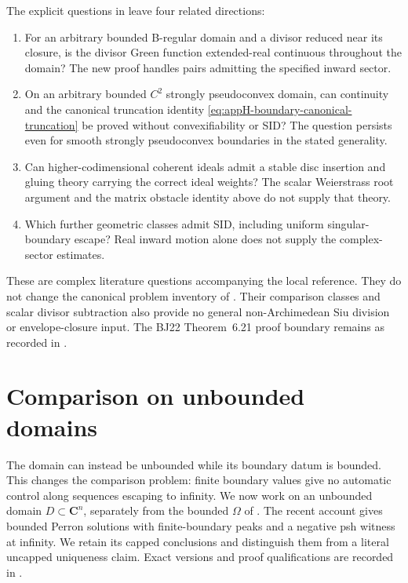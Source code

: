 The explicit questions in
\cite[actual pp.~33--34]{DaoNguyenTran26HypersurfaceGreenV1}
leave four related directions:
\begin{enumerate}
\item For an arbitrary bounded B-regular domain and a divisor reduced
      near its closure, is the divisor Green function extended-real
      continuous throughout the domain? The new proof handles pairs
      admitting the specified inward sector.
\item On an arbitrary bounded \(C^2\) strongly pseudoconvex domain,
      can continuity and the canonical truncation identity
      \eqref{eq:appH-boundary-canonical-truncation} be proved without
      convexifiability or SID? The question persists even for smooth
      strongly pseudoconvex boundaries in the stated generality.
\item Can higher-codimensional coherent ideals admit a stable disc
      insertion and gluing theory carrying the correct ideal weights?
      The scalar Weierstrass root argument and the matrix obstacle
      identity above do not supply that theory.
\item Which further geometric classes admit SID, including uniform
      singular-boundary escape? Real inward motion alone does not
      supply the complex-sector estimates.
\end{enumerate}
These are complex literature questions accompanying the local reference.
They do not change the canonical problem inventory of
. Their comparison classes and scalar divisor
subtraction also provide no general non-Archimedean Siu division or
envelope-closure input. The BJ22 Theorem~6.21 proof boundary remains
as recorded in .

\section{Comparison on unbounded domains}
\label{sec:appH-unbounded-domain-comparison}

The domain can instead be unbounded while its boundary datum is bounded.
This changes the comparison problem: finite boundary values give no
automatic control along sequences escaping to infinity. We now work on
an unbounded domain \(D\subset\mathbf C^n\), separately from the bounded
\(\Omega\) of .
The recent account \cite{Pawlaschyk26UnboundedPerronV1} gives bounded
Perron solutions with finite-boundary peaks and a negative psh witness
at infinity. We retain its capped conclusions and distinguish them
from a literal uncapped uniqueness claim. Exact versions and proof
qualifications are recorded in
.

